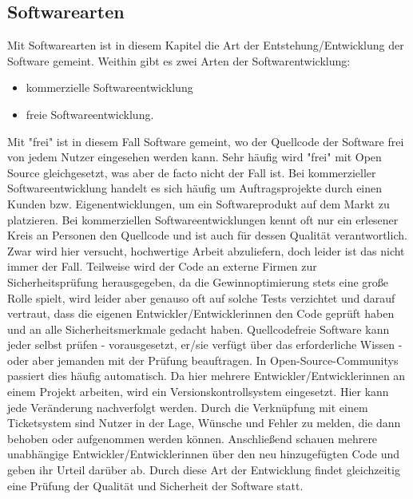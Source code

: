 \subsection{Softwarearten}
Mit Softwarearten ist in diesem Kapitel die Art der Entstehung/Entwicklung
der Software gemeint.
Weithin gibt es zwei Arten der Softwarentwicklung:
\begin{itemize}
  \item kommerzielle Softwareentwicklung
  \item freie Softwareentwicklung.
\end{itemize}
Mit "frei" ist in diesem Fall Software gemeint, wo der Quellcode der
Software frei von jedem Nutzer eingesehen werden kann. Sehr häufig wird
"frei" mit Open Source gleichgesetzt, was aber de facto nicht der Fall ist.
Bei kommerzieller Softwareentwicklung handelt es sich häufig um 
Auftragsprojekte durch einen Kunden bzw. Eigenentwicklungen, um ein
Softwareprodukt auf dem Markt zu platzieren.
Bei kommerziellen Softwareentwicklungen kennt oft nur ein erlesener Kreis
an Personen den Quellcode und ist auch für dessen Qualität verantwortlich.
Zwar wird hier versucht, hochwertige Arbeit abzuliefern, doch leider
ist das nicht immer der Fall. Teilweise wird der Code an externe
Firmen zur Sicherheitsprüfung herausgegeben, da die Gewinnoptimierung 
stets eine große Rolle spielt, wird leider aber genauso oft auf solche Tests
verzichtet und darauf vertraut, dass die eigenen Entwickler/Entwicklerinnen
den Code geprüft haben und an alle Sicherheitsmerkmale gedacht haben.
Quellcodefreie Software kann jeder selbst prüfen - vorausgesetzt, er/sie verfügt über 
das erforderliche Wissen - oder aber jemanden mit der Prüfung beauftragen.
In Open-Source-Communitys passiert dies häufig automatisch. Da hier 
mehrere Entwickler/Entwicklerinnen an einem Projekt arbeiten, wird ein
Versionskontrollsystem eingesetzt. Hier kann jede Veränderung nachverfolgt 
werden. Durch die Verknüpfung mit einem Ticketsystem sind Nutzer in der 
Lage, Wünsche und Fehler zu melden, die dann behoben oder
aufgenommen werden können. Anschließend schauen mehrere unabhängige 
Entwickler/Entwicklerinnen über den neu hinzugefügten Code und geben
ihr Urteil darüber ab. 
Durch diese Art der Entwicklung findet gleichzeitig eine Prüfung der
Qualität und Sicherheit der Software statt.  


